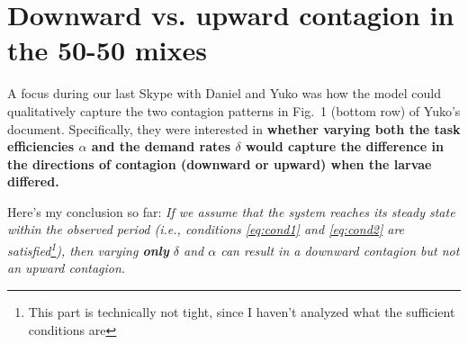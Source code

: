 \documentclass[10pt]{article}
\begin{document}
\newpage
\section{Downward vs. upward contagion in the 50-50 mixes} \label{sec:contagion}

A focus during our last Skype with Daniel and Yuko was how the model could qualitatively capture the two contagion patterns in Fig.~1 (bottom row) of Yuko's document. Specifically, they were interested in \textbf{whether varying both the task efficiencies $\alpha$ and the demand rates $\delta$ would capture the difference in the directions of contagion (downward or upward) when the larvae differed.}

Here's my conclusion so far: {\color{red}\textit{If we assume that the system reaches its steady state within the observed period (i.e., conditions \eqref{eq:cond1} and \eqref{eq:cond2} are satisfied\footnote{This part is technically not tight, since I haven't analyzed what the sufficient conditions are}), then varying \textbf{only} $\delta$ and $\alpha$ can result in a downward contagion but not an upward contagion.}}
\end{document}
